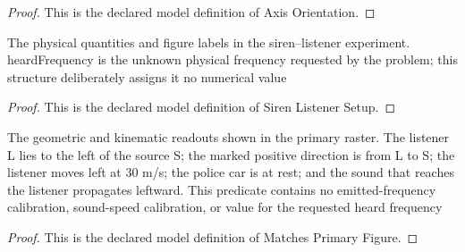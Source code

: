 \begin{proof}
  This is the declared model definition of Axis Orientation.
\end{proof}
\begin{definition}
  \label{def:physics:phyx-mini-0195:phyxminiproblems-problemphyxmini0195-sirenlistenersetup}
  The physical quantities and figure labels in the siren--listener experiment. heardFrequency is the unknown physical frequency requested by the problem; this structure deliberately assigns it no numerical value
\end{definition}
\begin{proof}
  This is the declared model definition of Siren Listener Setup.
\end{proof}
\begin{definition}
  \label{def:physics:phyx-mini-0195:phyxminiproblems-problemphyxmini0195-matchesprimaryfigure}
  The geometric and kinematic readouts shown in the primary raster. The listener L lies to the left of the source S; the marked positive direction is from L to S; the listener moves left at 30 m/s; the police car is at rest; and the sound that reaches the listener propagates leftward. This predicate contains no emitted-frequency calibration, sound-speed calibration, or value for the requested heard frequency
\end{definition}
\begin{proof}
  This is the declared model definition of Matches Primary Figure.
\end{proof}
